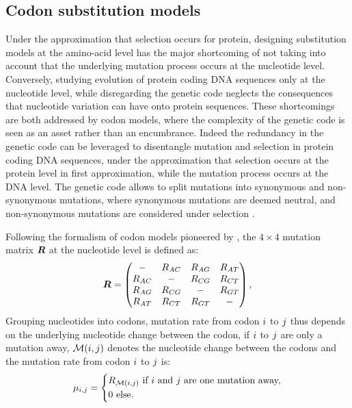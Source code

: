 \subsection{Codon {substitution} models}
Under the approximation that selection occurs for protein, designing \gls{substitution} models at the amino-acid level has the major shortcoming of not taking into account that the underlying mutation process occurs at the nucleotide level.
Conversely, studying evolution of protein coding \acrshort{DNA} sequences only at the nucleotide level, while disregarding the genetic code neglects the consequences that nucleotide variation can have onto protein sequences.
These shortcomings are both addressed by \gls{codon} models, where the complexity of the genetic code is seen as an asset rather than an encumbrance.
Indeed the redundancy in the genetic code can be leveraged to disentangle mutation and selection in protein coding \acrshort{DNA} sequences, under the approximation that selection occurs at the protein level in first approximation, while the mutation process occurs at the \acrshort{DNA} level.
The genetic code allows to split mutations into synonymous and non-synonymous mutations, where synonymous mutations are deemed \gls{neutral}, and non-synonymous mutations are considered under selection \citep{Muse1994,Goldman1994}.

Following the formalism of \gls{codon} models pioneered by \citet{Muse1994}, the $4 \times 4$ mutation matrix $\bm{R}$ at the nucleotide level is defined as:
\begin{equation}
\label{eq:mutrates}
\bm{R} = \begin{pmatrix}
- & {R_{AC}} & 		{R_{AG}} & 		{R_{AT}} \\
{R_{AC}} & - & {R_{CG}} &		{R_{CT}} \\
{R_{AG}} & 		{R_{CG}} & - & {R_{GT}} \\
{R_{AT}} & 		{R_{CT}} & 		{R_{GT}} & -
\end{pmatrix},
\end{equation}
Grouping nucleotides into \glspl{codon}, mutation rate from \gls{codon} ${i}$ to ${j}$ thus depends on the underlying nucleotide change between the \gls{codon}, if ${i}$ to ${j}$ are only a mutation away, $\mathcal{M}({i}, {j})$ denotes the nucleotide change between the \glspl{codon} and the mutation rate from \gls{codon} ${i}$ to ${j}$ is:
\begin{equation}
\mu_{{i}, {j}} = 
\begin{dcases}
 R_{\mathcal{M}({i}, {j})} \text{ if ${i}$ and ${j}$ are one mutation away,} \\
 0 \text{ else.}
\end{dcases}
\end{equation}

